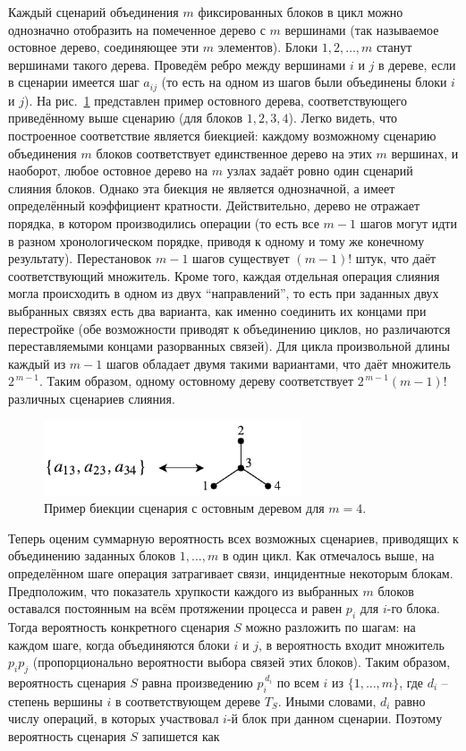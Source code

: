 Каждый сценарий объединения $m$ фиксированных блоков в цикл можно однозначно отобразить на помеченное дерево с $m$ вершинами (так называемое остовное дерево, соединяющее эти $m$ элементов).
Блоки $1,2,\dots,m$ станут вершинами такого дерева. Проведём ребро между вершинами $i$ и $j$ в дереве, если в сценарии имеется шаг $a_{ij}$ (то есть на одном из шагов были объединены блоки $i$ и $j$).
На рис.~\ref{tree-bijection} представлен пример остовного дерева, соответствующего приведённому выше сценарию (для блоков $1,2,3,4$).
Легко видеть, что построенное соответствие является биекцией: каждому возможному сценарию объединения $m$ блоков соответствует единственное дерево на этих $m$ вершинах, и наоборот, любое остовное дерево на $m$ узлах задаёт ровно один сценарий слияния блоков.
Однако эта биекция не является однозначной, а имеет определённый коэффициент кратности. Действительно, дерево не отражает порядка, в котором производились операции (то есть все $m-1$ шагов могут идти в разном хронологическом порядке, приводя к одному и тому же конечному результату).
Перестановок $m-1$ шагов существует $(m-1)!$ штук, что даёт соответствующий множитель. Кроме того, каждая отдельная операция слияния могла происходить в одном из двух ``направлений'', то есть при заданных двух выбранных связях есть два варианта, как именно соединить их концами при перестройке (обе возможности приводят к объединению циклов, но различаются переставляемыми концами разорванных связей).
Для цикла произвольной длины каждый из $m-1$ шагов обладает двумя такими вариантами, что даёт множитель $2^{\,m-1}$. Таким образом, одному остовному дереву соответствует $2^{\,m-1}(m-1)!$ различных сценариев слияния. 

\begin{figure}[h!]
    \centering
    \includegraphics[width=3in]{images/part2/tree-bijection.pdf}
    \caption{Пример биекции сценария с остовным деревом для $m=4$.}
    \label{tree-bijection}
\end{figure}

Теперь оценим суммарную вероятность всех возможных сценариев, приводящих к объединению заданных блоков $1,\dots,m$ в один цикл.
Как отмечалось выше, на определённом шаге операция затрагивает связи, инцидентные некоторым блокам.
Предположим, что показатель хрупкости каждого из выбранных $m$ блоков оставался постоянным на всём протяжении процесса и равен $p_i$ для $i$-го блока.
Тогда вероятность конкретного сценария $S$ можно разложить по шагам: на каждом шаге, когда объединяются блоки $i$ и $j$, в вероятность входит множитель $p_i p_j$ (пропорционально вероятности выбора связей этих блоков).
Таким образом, вероятность сценария $S$ равна произведению $p_i^{\,d_i}$ по всем $i$ из $\{1,\dots,m\}$, где $d_i$ -- степень вершины $i$ в соответствующем дереве $T_S$.
Иными словами, $d_i$ равно числу операций, в которых участвовал $i$-й блок при данном сценарии.
Поэтому вероятность сценария $S$ запишется как 


